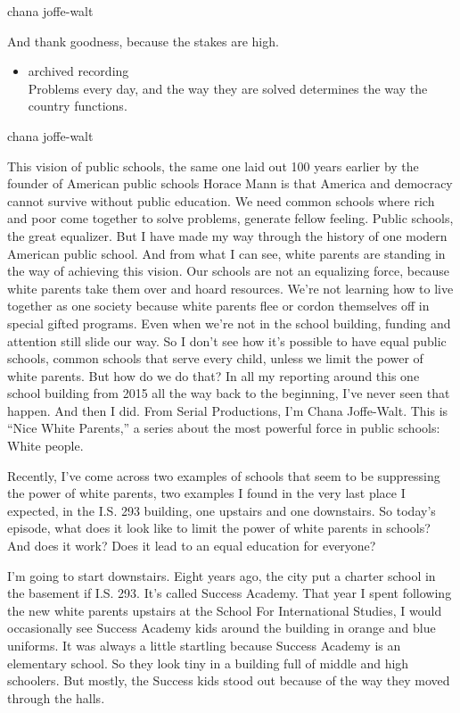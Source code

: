chana joffe-walt

And thank goodness, because the stakes are high.

\begin{itemize}
\tightlist
\item
  archived recording\\
  Problems every day, and the way they are solved determines the way the
  country functions.
\end{itemize}

chana joffe-walt

This vision of public schools, the same one laid out 100 years earlier
by the founder of American public schools Horace Mann is that America
and democracy cannot survive without public education. We need common
schools where rich and poor come together to solve problems, generate
fellow feeling. Public schools, the great equalizer. But I have made my
way through the history of one modern American public school. And from
what I can see, white parents are standing in the way of achieving this
vision. Our schools are not an equalizing force, because white parents
take them over and hoard resources. We're not learning how to live
together as one society because white parents flee or cordon themselves
off in special gifted programs. Even when we're not in the school
building, funding and attention still slide our way. So I don't see how
it's possible to have equal public schools, common schools that serve
every child, unless we limit the power of white parents. But how do we
do that? In all my reporting around this one school building from 2015
all the way back to the beginning, I've never seen that happen. And then
I did. From Serial Productions, I'm Chana Joffe-Walt. This is ``Nice
White Parents,'' a series about the most powerful force in public
schools: White people.

Recently, I've come across two examples of schools that seem to be
suppressing the power of white parents, two examples I found in the very
last place I expected, in the I.S. 293 building, one upstairs and one
downstairs. So today's episode, what does it look like to limit the
power of white parents in schools? And does it work? Does it lead to an
equal education for everyone?

I'm going to start downstairs. Eight years ago, the city put a charter
school in the basement if I.S. 293. It's called Success Academy. That
year I spent following the new white parents upstairs at the School For
International Studies, I would occasionally see Success Academy kids
around the building in orange and blue uniforms. It was always a little
startling because Success Academy is an elementary school. So they look
tiny in a building full of middle and high schoolers. But mostly, the
Success kids stood out because of the way they moved through the halls.

